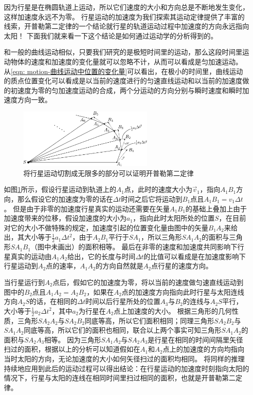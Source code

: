 因为行星是在椭圆轨道上运动，所以它们速度的大小和方向总是不断地发生变化，这样加速度永远不为零。
行星运动的加速度为我们探索其运动定律提供了丰富的线索，开普勒第二定律的一个结论就行星的轨道运动过程中加速度的方向永远指向太阳！
下面我们就来看一下这个结论是如何通过运动学的分析得到的。

和一般的曲线运动相似，只要我们研究的是极短时间里的运动，那么这段时间里运动物体的速度和加速度的变化量就可以忽略不计，从而可以看成是匀加速运动。
从\ref{eqn: motion-曲线运动中位置的变化量}可以看出，在极小的时间里，曲线运动的质点位置变化可以看成是以当前的速度进行的匀速直线运动和以当前的加速度做的初速度为零的匀加速度运动的合成，两个分运动的方向分别与瞬时速度和瞬时加速度方向一致。

\begin{figure}[hbtp]
\centering
\includegraphics[width=0.6\textwidth]{images/motion-24.pdf}
\caption{将行星运动切割成无限多的部分可以证明开普勒第二定律}\label{fig: motion-开普勒第二定律的证明}
\end{figure}

如图\ref{fig: motion-开普勒第二定律的证明}所示，假设行星运动到轨道上的$A_1$点，此时的速度大小为$\vec{v}_1$，指向$A_1B_1$方向，那么假设它的加速度为零的话在$\Delta t$时间之后它将运动到$B_1$点且$A_1B_1 = v_1\Delta t$。
但是由于非零的加速度行星真实的运动还需要在矢量$A_1B_1$的基础上叠加上由于加速度带来的位移，假设加速度的大小为$a_1$，指向此时太阳所处的位置$S$，在目前对它的大小不做特殊的规定，加速度引起的位置变化量由图中的矢量$B_1A_2$来给出，其大小等于$\frac{1}{2}a_1\Delta t^2$，由于$A_2B_1$平行于$SA_1$，所以三角形$SA_1A_2$的面积与三角形$SA_1B_1$（图中未画出）的面积相等。
最后在非零的速度和加速度共同影响下行星真实的运动由$A_1A_2$给出，它的长度与时间$\Delta t$的比值可以看成是在加速度影响下行星运动到$A_2$点的速率，$A_1A_2$的方向自然就是$A_2$点行星的速度方向。

当行星运行到$A_2$点后，假如它的加速度为零，将以当前的速度做匀速直线运动到图中的$B_2$点且$A_1A_2=A_2B_2$，如果在$A_2$点的加速度方向指向此时行星与太阳连线方向$A_2S$的话，在相同的$\Delta t$时间以后行星所处的位置$A_3$与$B_2$的连线与$A_2S$平行，大小等于$\frac{1}{2}a_2\Delta t^2$，其中$a_2$为行星在$A_2$点上加速度的大小。
根据三角形的几何性质，三角形$SA_2A_2$与$SA_2B_2$同底等高，所以它们面积相同；同理三角形$SA_2B_2$与$SA_1A_2$同底等高，所以它们的面积也相同，联合以上两个事实可知三角形$SA_1A_2$的面积与$SA_2A_3$相等。
因为三角形$SA_1A_2$与$SA_2A_3$是行星在相同的时间间隔里矢径扫过的面积，根据以上的分析可以知道假如在$A_1$和$A_2$点上的加速度的方向均指向当时太阳的方向，无论加速度的大小如何矢径扫过的面积均相同。
将同样的推理持续地应用到此后的运动过程可以得出结论：在行星运动的加速度时刻指向太阳的情况下，行星与太阳的连线在相同时间里扫过相同的面积，也就是开普勒第二定律。

